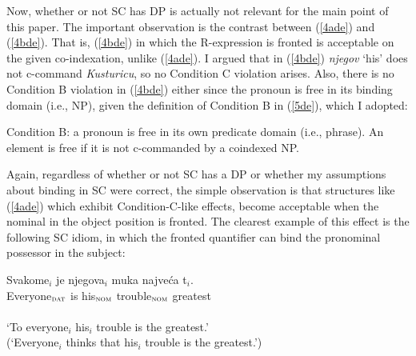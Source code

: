 \documentclass[
    output=paper,
    colorlinks,
    citecolor=brown,
]{langscibook}
\begin{document}
\begin{exe}
\ex \label{4de}
\begin{xlist}
\end{xlist}
\end{exe}

Now, whether or not SC has DP is actually not relevant for the main point of this paper. The important observation is the contrast between (\ref{4ade}) and (\ref{4bde}). That is, (\ref{4bde}) in which the R-expression is fronted is acceptable on the given co-indexation, unlike (\ref{4ade}). I argued that in (\ref{4bde}) \textit{njegov} ‘his’ does not c-command \textit{Kusturicu}, so no Condition C violation arises. Also, there is no Condition B violation in (\ref{4bde}) either since the pronoun is free in its binding domain (i.e., NP), given the definition of Condition B in (\ref{5de}), which I adopted:

\begin{exe}
\ex \label{5de}
Condition B: a pronoun is free in its own predicate domain (i.e., phrase). An element is free if it is not c-commanded by a coindexed NP.
\end{exe}

Again, regardless of whether or not SC has a DP or whether my assumptions about binding in SC were correct, the simple observation is that structures like (\ref{4ade}) which exhibit Condition-C-like effects, become acceptable when the nominal in the object position is fronted. The clearest example of this effect is the following SC idiom, in which the fronted quantifier can bind the pronominal possessor in the subject:

\begin{exe}
\ex \label{6de}
\gll Svakome$_{i}$  je njegova$_{i}$ muka najveća  t$_{i}$.\\
Everyone$_{\textsc{dat}}$ is his$_{\textsc{nom}}$ trouble$_{\textsc{nom}}$ greatest\\\\
‘To everyone$_{i}$ his$_{i}$ trouble is the greatest.’ \\
(‘Everyone$_{i}$ thinks that his$_{i}$ trouble is the greatest.’)
\end{exe}
\end{document}
